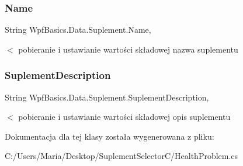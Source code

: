 \subsubsection{\texorpdfstring{Name}{Name}}
{\footnotesize\ttfamily String Wpf\+Basics.\+Data.\+Suplement.\+Name\hspace{0.3cm}{\ttfamily [get]}, {\ttfamily [set]}}

$<$ pobieranie i ustawianie wartości składowej nazwa suplementu \mbox{\label{class_wpf_basics_1_1_data_1_1_suplement_a5a13a37cdb3c962afa0142ca16056455}} 
\subsubsection{\texorpdfstring{Suplement\+Description}{SuplementDescription}}
{\footnotesize\ttfamily String Wpf\+Basics.\+Data.\+Suplement.\+Suplement\+Description\hspace{0.3cm}{\ttfamily [get]}, {\ttfamily [set]}}

$<$ pobieranie i ustawianie wartości składowej opis suplementu 

Dokumentacja dla tej klasy została wygenerowana z pliku\+:\begin{DoxyCompactItemize}
\item 
C\+:/\+Users/\+Maria/\+Desktop/\+Suplement\+Selector\+C/Health\+Problem.\+cs\end{DoxyCompactItemize}

